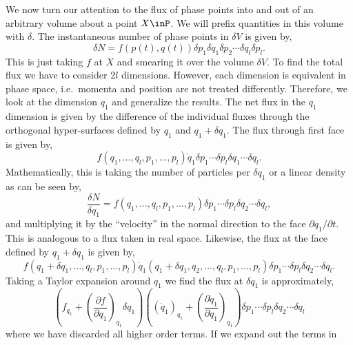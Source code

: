 We now turn our attention to the flux of phase points into and out of an
arbitrary volume about a point $X\inP$. We will prefix quantities in this volume
with $\delta$. The instantaneous number of phase points in $\delta V$ is given
by,
\begin{equation*}
	\delta N = f(p(t),q(t))\delta p_1 \delta q_{1} \delta p_{2} \cdots \delta
	q_{l} \delta p_{l}.
\end{equation*}
This is just taking $f$ at $X$ and smearing it over the volume $\delta V$. To
find the total flux we have to consider $2l$ dimensions. However, each dimension
is equivalent in phase space, i.e.\ momenta and position are not treated
differently. Therefore, we look at the dimension $q_{1}$ and generalize the
results. The net flux in the $q_{1}$ dimension is given by the difference of the
individual fluxes through the orthogonal hyper-surfaces defined by $q_{1}$ and
$q_{1} + \delta q_{1}$. The flux through first face is given by,
\begin{equation*}
	f(q_{1},\ldots,q_{l}, p_{1},\ldots,p_{l})\dot{q}_1 \delta p_1 \cdots \delta p_{l}
	\delta q_1 \cdots \delta q_{l}.
\end{equation*}
Mathematically, this is taking the number of particles per $\delta q_{1}$
or a linear density as can be seen by,
\begin{equation*}
	\frac{\delta N}{\delta q_{1}} = f(q_{1},\ldots,q_{l}, p_{1},\ldots,p_{l})
	\delta p_1 \cdots \delta p_{l} \delta q_2 \cdots \delta q_{l},
\end{equation*}
and multiplying it by the ``velocity'' in the normal direction to the face
$\partial q_{1}/\partial t$. This is analogous to a flux taken in real space.
Likewise, the flux at the face defined by $q_{1} + \delta q_{1}$ is given by,
\begin{equation*}
	f(q_{1} + \delta q_{1},\ldots,q_{l}, p_{1},\ldots,p_{l})
	\dot{q}_{1}(q_{1} + \delta q_{1},q_{2},\ldots,q_{l}, p_{1},\ldots,p_{l})
	\delta p_1 \cdots \delta p_{l} \delta q_2 \cdots \delta q_{l}.
\end{equation*}
Taking a Taylor expansion around $q_{1}$ we find the flux at $\delta q_{1}$ is
approximately,
\begin{equation*}
	\left(f_{q_{1}} + \left(\frac{\partial f}{\partial q_{1}}\right)_{q_{1}}
	\delta q_{1}\right)
	\left((\dot{q}_{1})_{q_{1}} + \left(\frac{\partial \dot{q}_{1}}
	{\partial q_{1}}\right)_{q_{1}}\right)
	\delta p_1 \cdots \delta p_{l} \delta q_2 \cdots \delta q_{l}
\end{equation*}
where we have discarded all higher order terms. If we expand out the terms in
